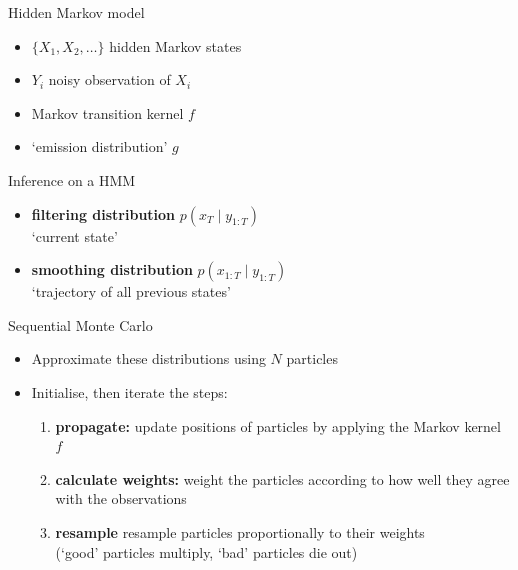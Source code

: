 \documentclass[aspectratio=169]{beamer}
\begin{document}
\begin{frame}{Hidden Markov model}
\begin{center}
\end{center}

\begin{itemize}
\item $\{X_1, X_2, \dots\}$ hidden Markov states
\item $Y_i$ noisy observation of $X_i$
\item Markov transition kernel $f$
\item `emission distribution' $g$
\end{itemize}
\end{frame}

\begin{frame}{Inference on a HMM}
\begin{itemize}
\item \textbf{filtering distribution} $p(x_{T}\mid y_{1:T})$\\
`current state'
\item \textbf{smoothing distribution} $p(x_{1:T} \mid y_{1:T})$\\
`trajectory of all previous states'
\end{itemize}
\end{frame}

\begin{frame}{Sequential Monte Carlo}
\begin{itemize}
\item Approximate these distributions using $N$ particles
\item  Initialise, then iterate the steps:
\begin{enumerate}
\item \textbf{propagate:} update positions of particles by applying the Markov kernel $f$
\item \textbf{calculate weights:} weight the particles according to how well they agree with the observations
\item \textbf{resample} resample particles proportionally to their weights\\
(`good' particles multiply, `bad' particles die out)
\end{enumerate}
\end{itemize}
\end{frame}
\end{document}
